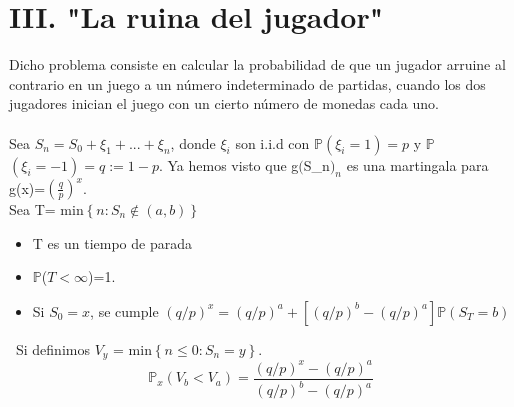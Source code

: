 \documentclass[letterpaper, 10 pt, conference]{ieeeconf}  %
\begin{document}
\section*{ III. "La ruina del jugador"}\label{sec:2.4}
 Dicho problema consiste en calcular la probabilidad de que un jugador arruine al contrario en un juego a un número indeterminado de partidas, cuando los dos jugadores inician el juego con un cierto número de monedas cada uno.\\ \\
 
 Sea $S_{n}=S_{0}+\xi_{1}+...+\xi_{n}$, donde $\xi_{i}$ son i.i.d con \(\mathbb{P}\)$(\xi_{i}=1)=p$ y \(\mathbb{P}\)$(\xi_{i}=-1)=q:=1-p$. Ya hemos visto que g$($S_{n}$)_{n}$ es una martingala para g(x)=$(\frac{q}{p})^{x}$. \\ Sea T= min$\left\lbrace n : S_{n} \not\in (a,b) \right\rbrace$ \\
 \begin{itemize}
\item T es un tiempo de parada
\item \(\mathbb{P}\)($ T < \infty$)=1.
\item Si $S_{0}=x$, se cumple $(q/p)^{x}=(q/p)^{a}+[(q/p)^{b}-(q/p)^{a}]\mathbb{P}(S_{T}=b)$
\end{itemize}\
Si definimos $V_{y}$ = min$\left\lbrace   n \leq 0 : S_{n} = y  \right\rbrace$.\\
\begin{equation*}
    \mathbb{P}_{x}(V_{b}<V_{a})=\dfrac{(q/p)^{x}-(q/p)^{a}}{(q/p)^{b}-(q/p)^{a}}
\end{equation*}


 
 


     
\end{document}
